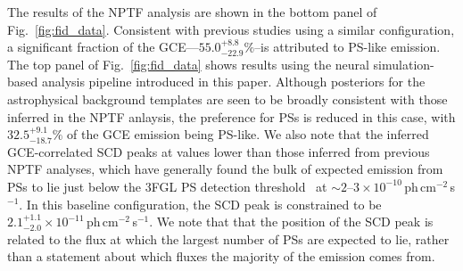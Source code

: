 \documentclass[prd,aps,10pt,nofootinbib,twocolumn,superscriptaddress,preprintnumbers,balancelastpage,longbibliography]{revtex4-1}
\begin{document}
The results of the NPTF analysis are shown in the bottom panel of Fig.~\ref{fig:fid_data}. Consistent with previous studies using a similar configuration, a significant fraction of the GCE---$55.0^{+8.8}_{-22.9}\%$--is attributed to PS-like emission.
The top panel of Fig.~\ref{fig:fid_data} shows results using the neural simulation-based analysis pipeline introduced in this paper. Although posteriors for the astrophysical background templates are seen to be broadly consistent with those inferred in the NPTF anlaysis, the preference for PSs is reduced in this case, with $32.5^{+9.1}_{-18.7}\%$ of the GCE emission being PS-like. We also note that the inferred GCE-correlated SCD peaks at values lower than those inferred from previous NPTF analyses, which have generally found the bulk of expected emission from PSs to lie just below the 3FGL PS detection threshold~\cite{Lee:2015fea} at $\sim2$--$3\times 10^{-10}$\,ph\,cm$^{-2}$\,s$^{-1}$. In this baseline configuration, the SCD peak is constrained to be $2.1^{+1.1}_{-2.0}\times 10^{-11}$\,ph\,cm$^{-2}$\,s$^{-1}$. We note that that the position of the SCD peak is related to the flux at which the largest number of PSs are expected to lie, rather than a statement about which fluxes the majority of the emission comes from.
\end{document}
